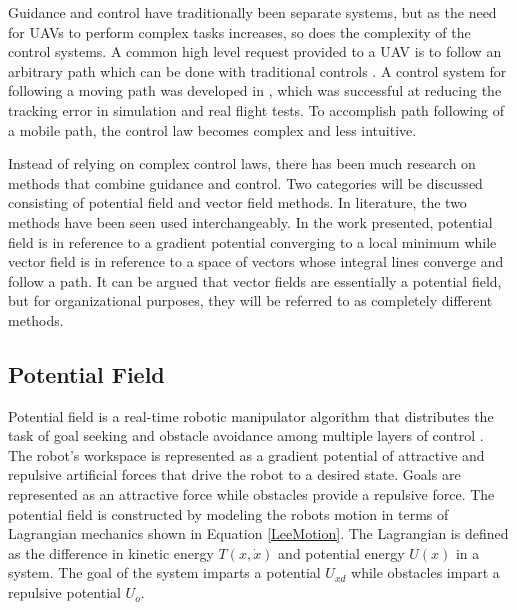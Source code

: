 \documentclass[numbered,pdftex]{ohio-etd}
\begin{document}
Guidance and control have traditionally been separate systems, but as the need for UAVs to perform complex tasks increases, so does the complexity of the control systems. A common high level request provided to a UAV is to follow an arbitrary path which can be done with traditional controls \cite{zhao_curved_2017}. A control system for following a moving path was developed in \cite{oliveira_moving_2016}, which was successful at reducing the tracking error in simulation and real flight tests. To accomplish path following of a mobile path, the control law becomes complex and less intuitive. 

Instead of relying on complex control laws, there has been much research on methods that combine guidance and control.  Two categories will be discussed consisting of potential field and vector field methods. In literature, the two methods have been seen used interchangeably. In the work presented, potential field is in reference to a gradient potential converging to a local minimum while vector field is in reference to a space of vectors whose integral lines converge and follow a path. It can be argued that vector fields are essentially a potential field, but for organizational purposes, they will be referred to as completely different methods. 

\subsection{Potential Field}
Potential field is a real-time robotic manipulator algorithm that distributes the task of goal seeking and obstacle avoidance among multiple layers of control \cite{khatib_real-time_1986}. The robot's workspace is represented as a gradient potential of attractive and repulsive artificial forces that drive the robot to a desired state. Goals are represented as an attractive force while obstacles provide a repulsive force. The potential field is constructed by modeling the robots motion in terms of Lagrangian mechanics shown in Equation \ref{LeeMotion}. The Lagrangian is defined as the difference in kinetic energy $T(x,\dot{x})$ and potential energy $U(x)$ in a system. The goal of the system imparts a potential $U_{xd}$ while obstacles impart a repulsive potential $U_o$. 
\end{document}
